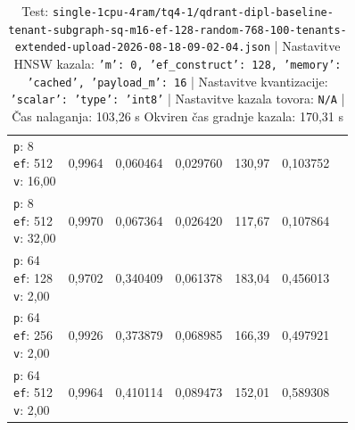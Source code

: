 \begin{table}[htbp]
\begin{tabularx}{\textwidth}{Xrrrrrr}
    \makecell{\texttt{p}: 8\\\texttt{ef}: 512\\\texttt{v}: 16,00} & 0,9964 & 0,060464 & 0,029760 & 130,97 & 0,103752 \\
    \makecell{\texttt{p}: 8\\\texttt{ef}: 512\\\texttt{v}: 32,00} & 0,9970 & 0,067364 & 0,026420 & 117,67 & 0,107864 \\
    \makecell{\texttt{p}: 64\\\texttt{ef}: 128\\\texttt{v}: 2,00} & 0,9702 & 0,340409 & 0,061378 & 183,04 & 0,456013 \\
    \makecell{\texttt{p}: 64\\\texttt{ef}: 256\\\texttt{v}: 2,00} & 0,9926 & 0,373879 & 0,068985 & 166,39 & 0,497921 \\
    \makecell{\texttt{p}: 64\\\texttt{ef}: 512\\\texttt{v}: 2,00} & 0,9964 & 0,410114 & 0,089473 & 152,01 & 0,589308 \\
    \bottomrule
  \end{tabularx}
\caption* {Test: \texttt{single-1cpu-4ram/tq4-1/qdrant-dipl-baseline-tenant-subgraph-sq-m16-ef-128-random-768-100-tenants-extended-upload-2026-08-18-09-02-04.json} | Nastavitve HNSW kazala: \texttt{{'m': 0, 'ef\_construct': 128, 'memory': 'cached', 'payload\_m': 16}} | Nastavitve kvantizacije: \texttt{{'scalar': {'type': 'int8'}}} | Nastavitve kazala tovora: \texttt{N/A} | Čas nalaganja: 103,26 s Okviren čas gradnje kazala: 170,31 s}\end{table}


